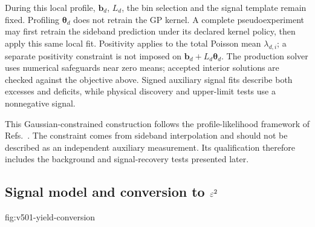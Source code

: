 During this local profile, $\bm b_d$, $L_d$, the bin selection and the signal
template remain fixed. Profiling $\bm\theta_d$ does not retrain the GP kernel.
A complete pseudoexperiment may first retrain the sideband prediction under
its declared kernel policy, then apply this same local fit. Positivity
applies to the total Poisson mean $\lambda_{d,i}$; a separate positivity
constraint is not imposed on $\bm b_d+L_d\bm\theta_d$. The production solver
uses numerical safeguards near zero means; accepted interior solutions are
checked against the objective above. Signed auxiliary signal fits describe
both excesses and deficits, while physical discovery and upper-limit tests
use a nonnegative signal.

This Gaussian-constrained construction follows the profile-likelihood
framework of Refs.~\cite{HistFactory,Cowan2011,FrateGP2017}. The constraint
comes from sideband interpolation and should not be described as an
independent auxiliary measurement. Its qualification therefore includes the
background and signal-recovery tests presented later.

\subsection{Signal model and conversion to \texorpdfstring{$\varepsilon^2$}{epsilon2}}
\label{sec:v501-signal-conversion}

{fig:v501-yield-conversion}


